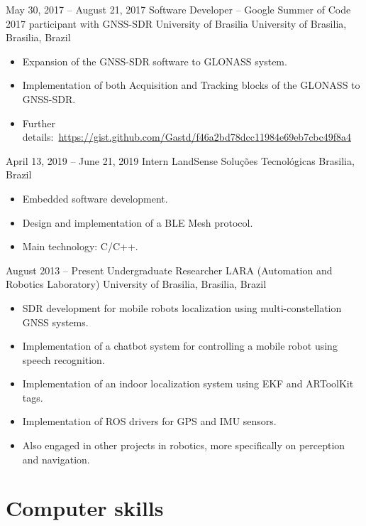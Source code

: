 \documentclass[a4paper, 10pt]{moderncv}        %
\begin{document}
\cventry
{May 30, 2017 -- August 21, 2017}
{Software Developer -- Google Summer of Code 2017 participant with GNSS-SDR}
{University of Brasilia}
{University of Brasilia, Brasilia, Brazil}
{}
{\begin{itemize}%
    \item Expansion of the GNSS-SDR software to GLONASS system.
    \item Implementation of both Acquisition and Tracking blocks of the GLONASS to GNSS-SDR.
    \item Further details:~\url{https://gist.github.com/Gastd/f46a2bd78dcc11984e69eb7cbc49f8a4}
    \end{itemize}}
\cventry
{April 13, 2019 -- June 21, 2019}
{Intern}
{LandSense Soluções Tecnológicas}
{Brasilia, Brazil}
{}
{\begin{itemize}%
    \item Embedded software development.
    \item Design and implementation of a BLE Mesh protocol.
    \item Main technology: C/C++.
    \end{itemize}}
\cventry
{August 2013 -- Present}
{Undergraduate Researcher}
{LARA (Automation and Robotics Laboratory)}
{University of Brasilia, Brasilia, Brazil}
{}
{\begin{itemize}%
    \item SDR development for mobile robots localization using multi-constellation GNSS systems.
    \item Implementation of a \textquotedbl{}chatbot\textquotedbl{} system for controlling a mobile robot using speech recognition.
    \item Implementation of an indoor localization system using EKF and ARToolKit tags.
    \item Implementation of ROS drivers for GPS and IMU sensors.
    \item Also engaged in other projects in robotics, more specifically on perception and navigation.
    \end{itemize}}

\section{Computer skills}
\end{document}

